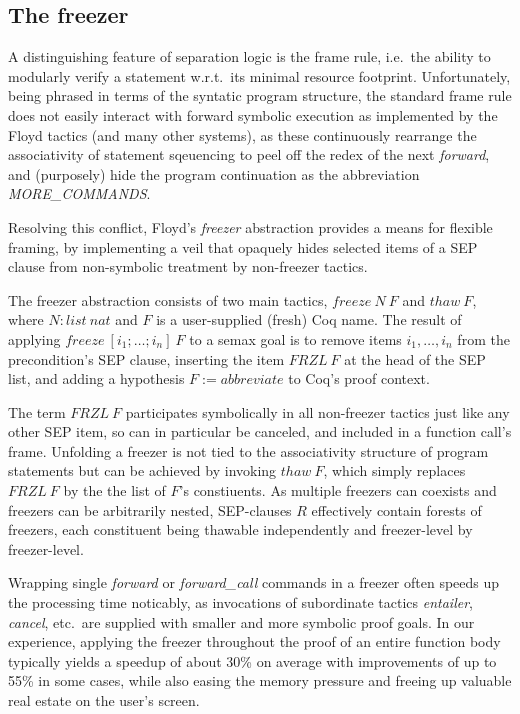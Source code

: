 \documentclass[12pt,fleqn,openany,oneside,showtrims]{memoir}
\begin{document}
\subsection{The freezer}
A distinguishing feature of separation logic is the frame rule,
i.e.~the ability to modularly verify a statement w.r.t.~its minimal
resource footprint. Unfortunately, being phrased in terms of the
syntatic program structure, the standard frame rule does not easily
interact with forward symbolic execution as implemented by the Floyd
tactics (and many other systems), as these continuously rearrange the
associativity of statement sqeuencing to peel off the redex of the
next \emph{forward}, and (purposely) hide the program continuation as
the abbreviation \emph{MORE\_COMMANDS}. 

Resolving this conflict, Floyd's \emph{freezer} abstraction provides a
means for flexible framing, by implementing a veil that opaquely hides
selected items of a SEP clause from non-symbolic treatment by
non-freezer tactics.

The freezer abstraction consists of two main tactics, $\mathit{freeze}\
N\ F$ and $\mathit{thaw}\ F$, where $N:\mathit{list\ nat}$ and $F$ is
a user-supplied (fresh) Coq name. The result of applying
$\mathit{freeze}\ [i_1;\ldots;i_n]\ F$ to a semax goal is to remove
items $i_1,\ldots,i_n$ from the precondition's SEP clause, inserting
the item $\mathit{FRZL}\ F$ at the head of the SEP list, and adding a
hypothesis $F := \mathit{abbreviate}$ to Coq's proof context.

The term $\mathit{FRZL}\ F$ participates symbolically in all
non-freezer tactics just like any other SEP item, so can in particular
be canceled, and included in a function call's frame.  Unfolding a
freezer is not tied to the associativity structure of program
statements but can be achieved by invoking $\mathit{thaw}\ F$, which
simply replaces $\mathit{FRZL}\ F$ by the the list of $F$'s
constiuents.  As multiple freezers can coexists and freezers can be
arbitrarily nested, SEP-clauses $R$ effectively contain forests of
freezers, each constituent being thawable independently and
freezer-level by freezer-level.

Wrapping single \emph{forward} or \emph{forward\_call} commands in a
freezer often speeds up the processing time noticably, as invocations
of subordinate tactics \emph{entailer}, \emph{cancel}, etc.~are
supplied with smaller and more symbolic proof goals. In our
experience, applying the freezer throughout the proof of an entire
function body typically yields a speedup of about 30\% on average with
improvements of up to 55\% in some cases, while also easing the memory
pressure and freeing up valuable real estate on the user's screen.
\end{document}
